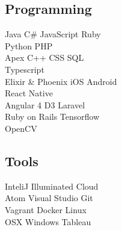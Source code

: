 \documentclass[]{deedy-resume-openfont}
\begin{document}
\begin{minipage}[t]{0.33\textwidth}
\subsection{Programming}
Java \textbullet{}   C\# \textbullet{} JavaScript \textbullet{} Ruby\\
Python \textbullet{} PHP\\
\sectionsep
{}
Apex \textbullet{} C++ \textbullet{} CSS \textbullet{} SQL\\
Typescript\\
\sectionsep
{}
Elixir \& Phoenix \textbullet{} iOS \textbullet{} Android\\
React Native\\
\sectionsep
{}
Angular 4 \textbullet{} D3 \textbullet{} Laravel \\
Ruby on Rails \textbullet{} Tensorflow\\
OpenCV
\sectionsep
\subsection{Tools}
InteliJ \textbullet{} Illuminated Cloud \\
Atom \textbullet{} Visual Studio \textbullet{} Git\\
Vagrant \textbullet{} Docker \textbullet{} Linux\\
OSX \textbullet{} Windows \textbullet{} Tableau
\sectionsep

%
%

\end{minipage}
\hfill
\end{document}
